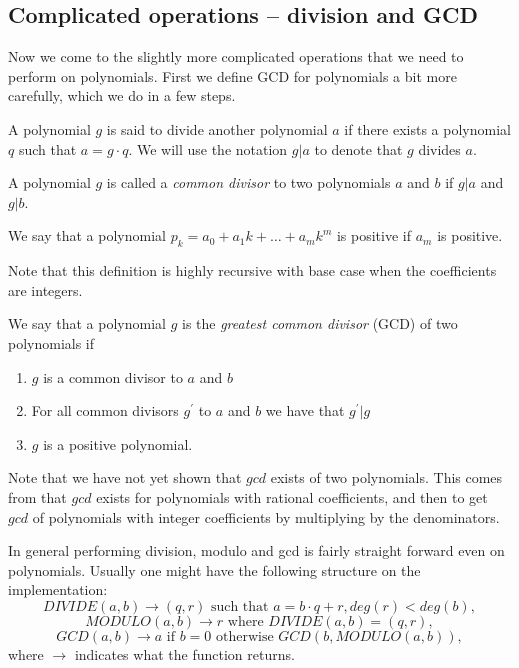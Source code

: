 \subsection{Complicated operations -- division and GCD}\label{Ch: div,mod,gcd}\label{Sub: diffop}
Now we come to the slightly more complicated operations that we need to perform on polynomials. First we define GCD for polynomials a bit more carefully, which we do in a few steps.
\begin{definition}\label{Def: divide}
  A polynomial $g$ is said to divide another polynomial $a$ if there exists a polynomial $q$ such that $a=g\cdot q$. We will use the notation $g|a$ to denote that $g$ divides $a$.
\end{definition}
\begin{definition}\label{Def: common divisor}
  A polynomial $g$ is called a \textit{common divisor} to two polynomials $a$ and $b$ if $g|a$ and $g|b$.
\end{definition}
\begin{definition}
  We say that a polynomial $p_k=a_0+a_1k+\ldots+a_mk^m$ is positive if $a_m$ is positive.
\end{definition}
\begin{remark}
  Note that this definition is highly recursive with base case when the coefficients are integers.
\end{remark}
\begin{definition}\label{Def: greatest common divisor}
  We say that a polynomial $g$ is the \textit{greatest common divisor} (GCD) of two polynomials if
  \begin{enumerate}
    \item $g$ is a common divisor to $a$ and $b$
    \item For all common divisors $g^\prime$ to $a$ and $b$ we have that $g^\prime|g$
    \item $g$ is a positive polynomial.
  \end{enumerate}
\end{definition}
\begin{remark}
  Note that we have not yet shown that $gcd$ exists of two polynomials. This comes from that $gcd$ exists for polynomials with rational coefficients, and then to get $gcd$ of polynomials with integer coefficients by multiplying by the denominators.
\end{remark}
In general performing division, modulo and gcd is fairly straight forward even on polynomials. Usually one might have the following structure on the implementation:
\begin{equation}\label{Eq: Theory,standard divide}
  DIVIDE(a,b) \rightarrow (q,r) \text{ such that } a=b\cdot q + r, deg(r) < deg(b),
\end{equation}
\begin{equation}
  MODULO(a,b) \rightarrow r \text{ where } DIVIDE(a,b) = (q,r),
\end{equation}
\begin{equation}\label{Eq: Theory,standard gcd}
  GCD(a,b) \rightarrow a \text{ if } b=0 \text{ otherwise } GCD(b,MODULO(a,b)),
\end{equation}
where $\rightarrow$ indicates what the function returns.

